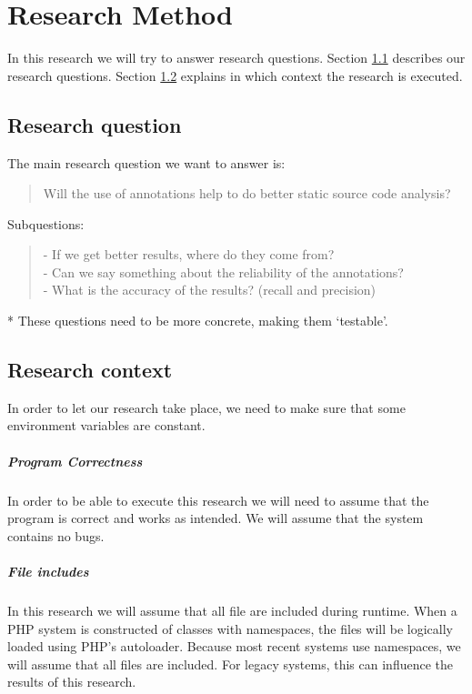 \documentclass[../main.tex]{subfiles}
\begin{document}
    \chapter{Research Method}\label{chap:research_method}

    In this research we will try to answer research questions.
    Section \ref{sec:research_question} describes our research questions.
    Section \ref{sec:research_context} explains in which context the research is executed.

    \section{Research question}\label{sec:research_question}
    The main research question we want to answer is:
    \\
    \begin{quote}
        Will the use of annotations\footnotemark{} help to do better static source code analysis?
    \end{quote}
    Subquestions:
    \begin{quote}
        - If we get better results, where do they come from?
        \\
        - Can we say something about the reliability of the annotations?
        \\
        - What is the accuracy of the results? (recall and precision)
    \end{quote}
    * These questions need to be more concrete, making them `testable'.
    \\
    
    
    \section{Research context}\label{sec:research_context}
    In order to let our research take place, we need to make sure that some environment variables are constant.
    
    \paragraph{Program Correctness}
    In order to be able to execute this research we will need to assume that the program is correct and works as intended. We will assume that the system contains no bugs.
    
    \paragraph{File includes}
    In this research we will assume that all file are included during runtime. 
    When a PHP system is constructed of classes with namespaces, the files will be logically loaded using PHP's autoloader.
    Because most recent systems use namespaces, we will assume that all files are included.
    For legacy systems, this can influence the results of this research.
    
\end{document}
